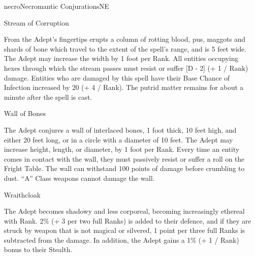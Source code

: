 \begin{college}[1.1]{necro}{Necromantic Conjurations}{NE}
\begin{spell}[S-14]{Stream of Corruption}

\begin{effects}
From the Adept's fingertips erupts a column of rotting blood, pus,
maggots and shards of bone which travel to the extent of the spell's
range, and is 5 feet wide.  The Adept may increase the width by 1 foot
per Rank.  All entities occupying hexes through which the stream
passes must resist or suffer [D - 2] (+ 1 / Rank) damage.  Entities
who are damaged by this spell have their Base Chance of Infection
increased by 20 (+ 4 / Rank).  The putrid matter remains for about a
minute after the spell is cast.
\end{effects}
\end{spell}

\begin{spell}[S-15]{Wall of Bones}

\begin{effects}
The Adept conjures a wall of interlaced bones, 1 foot thick, 10 feet
high, and either 20 feet long, or in a circle with a diameter of 10
feet.  The Adept may increase height, length, or diameter, by 1 foot
per Rank.  Every time an entity comes in contact with the wall, they
must passively resist or suffer a roll on the Fright Table.  The wall
can withstand 100 points of damage before crumbling to dust.  ``A''
Class weapons cannot damage the wall.
\end{effects}
\end{spell}

\begin{spell}[S-16]{Wraithcloak}

\begin{effects}
The Adept becomes shadowy and less corporeal, becoming increasingly
ethereal with Rank.  2\% (+ 3 per two full Ranks) is added to their
defence, and if they are struck by weapon that is not magical or
silvered, 1 point per three full Ranks is subtracted from the damage.
In addition, the Adept gains a 1\% (+ 1 / Rank) bonus to their
Stealth.
\end{effects}
\end{spell}


\end{college}
